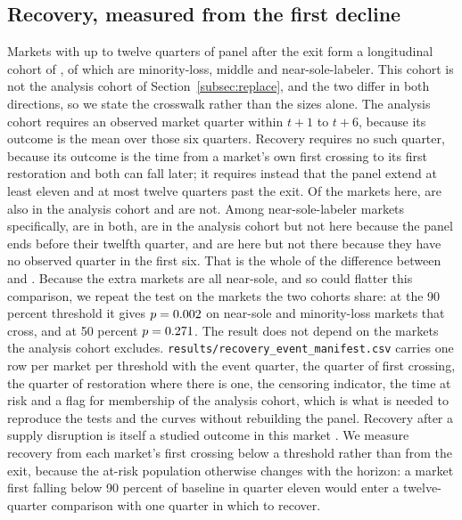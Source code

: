 \documentclass[pdflatex,sn-vancouver-num,Numbered]{sn-jnl}
\begin{document}
\subsection{Recovery, measured from the first decline}\label{subsec:recovery}

Markets with up to twelve quarters of panel after the exit form a longitudinal cohort of
\nCrossCohort, of which \nCrossMinorOf are minority-loss, \nCrossMid middle and \nCrossSoleOf
near-sole-labeler. This cohort is not the analysis cohort of
Section~\ref{subsec:replace}, and the two differ in both directions, so we state the crosswalk
rather than the sizes alone. The analysis cohort requires an observed market quarter within
$t+1$ to $t+6$, because its outcome is the mean over those six quarters. Recovery requires no
such quarter, because its outcome is the time from a market's own first crossing to its first
restoration and both can fall later; it requires instead that the panel extend at least eleven
and at most twelve quarters
past the exit. Of the \nCrossCohort markets here, \nRecSharedAll are also in the analysis
cohort and \nRecOnlyAll are not. Among near-sole-labeler markets specifically, \nRecSharedSole
are in both, \nRecMainOnlySole are in the analysis cohort but not here because the panel ends
before their twelfth quarter, and \nRecOnlySole are here but not there because they have no
observed quarter in the first six. That is the whole of the difference between
\nCrossSoleOf and \nCohortSole. Because the extra markets are all near-sole, and so could
flatter this comparison, we repeat the test on the \nRecSharedAll markets the two cohorts
share: at the 90 percent threshold it gives $p=0.002$ on \nSharedSoleCross
near-sole and \nSharedMinorCross minority-loss markets that cross, and at 50 percent
$p=0.271$. The result does not depend on the markets the analysis cohort
excludes. \texttt{results/recovery\_event\_manifest.csv} carries one row per market per
threshold with the event quarter, the quarter of first crossing, the quarter of restoration
where there is one, the censoring indicator, the time at risk and a flag for membership of the
analysis cohort, which is what is needed to reproduce the tests and the curves without
rebuilding the panel. Recovery after a supply disruption is itself
a studied outcome in this market \citep{lee2026}. We measure recovery from each market's first
crossing below a threshold rather than from the exit, because the at-risk population otherwise
changes with the horizon: a market first falling below 90 percent of baseline in quarter eleven
would enter a twelve-quarter comparison with one quarter in which to recover.
\end{document}
